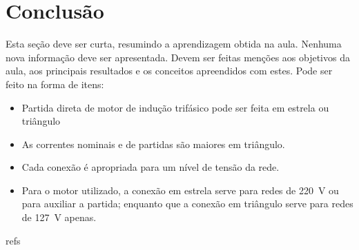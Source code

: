 \documentclass[twocolumn]{article}
\begin{document}
\section{Conclusão}
Esta seção deve ser curta, resumindo a aprendizagem obtida na aula. Nenhuma nova informação deve ser apresentada. Devem ser feitas menções aos objetivos da aula, aos principais resultados e os conceitos apreendidos com estes. Pode ser feito na forma de itens:

\begin{itemize}
	\item Partida direta de motor de indução trifásico pode ser feita em estrela ou triângulo
	\item As correntes nominais e de partidas são maiores em triângulo.
	\item Cada conexão é apropriada para um nível de tensão da rede.
	\item Para o motor utilizado, a conexão em estrela serve para redes de 220~V ou para auxiliar a partida; enquanto que a conexão em triângulo serve para redes de 127~V apenas.
\end{itemize}




\begin{thebibliography}{refs}
\bibitem{}

\end{thebibliography}
\end{document}
